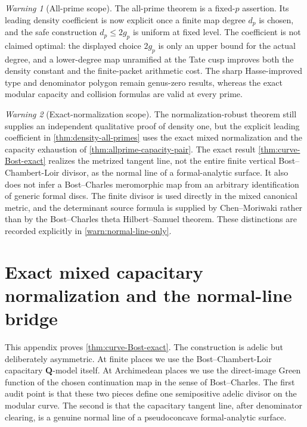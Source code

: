 \documentclass[11pt]{article}
\theoremstyle{definition}
\theoremstyle{remark}
\newtheorem{warning}[warning]{Warning}
\newcommand{\Q}{\mathbf Q}
\begin{document}
\begin{warning}[All-prime scope]
The all-prime theorem is a fixed-$p$ assertion.  Its leading density
coefficient is now explicit once a finite map degree $d_p$ is chosen, and the
safe construction $d_p\le2g_p$ is uniform at fixed level.  The coefficient is
not claimed optimal: the displayed choice $2g_p$ is only an upper bound for the actual degree, and a lower-degree map unramified at the Tate cusp improves
both the density constant and the finite-packet arithmetic cost.  The sharp
Hasse-improved type and denominator polygon remain genus-zero results, whereas
the exact modular capacity and collision formulas are valid at every prime.
\end{warning}

\begin{warning}[Exact-normalization scope]
The normalization-robust theorem still supplies an independent qualitative
proof of density one, but the explicit leading coefficient in
\cref{thm:density-all-primes} uses the exact mixed normalization and the
capacity exhaustion of \cref{thm:allprime-capacity-pair}.  The exact result
\cref{thm:curve-Bost-exact} realizes the metrized tangent line, not the entire
finite vertical Bost--Chambert-Loir divisor, as the normal line of a
formal-analytic surface.  It also does not infer a Bost--Charles meromorphic
map from an arbitrary identification of generic formal discs.  The finite
divisor is used directly in the mixed canonical metric, and the determinant
source formula is supplied by Chen--Moriwaki rather than by the Bost--Charles
theta Hilbert--Samuel theorem.  These distinctions are recorded explicitly in
\cref{warn:normal-line-only}.
\end{warning}

\appendix


\section{Exact mixed capacitary normalization and the normal-line bridge}
\label{app:exact-normalization}

This appendix proves \cref{thm:curve-Bost-exact}.  The construction is
adelic but deliberately asymmetric.  At finite places we use the
Bost--Chambert-Loir capacitary $\Q$-model itself.  At Archimedean places we
use the direct-image Green function of the chosen continuation map in the
sense of Bost--Charles.  The first audit point is that these two pieces define
one semipositive adelic divisor on the modular curve.  The second is that the
capacitary tangent line, after denominator clearing, is a genuine normal line
of a pseudoconcave formal-analytic surface.
\end{document}
